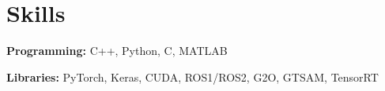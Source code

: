 \documentclass[letterpaper,11pt]{article}
\newcommand{\resumeSubHeadingListStart}{\begin{itemize}[leftmargin=0.15in, label={}]}
\newcommand{\resumeSubHeadingListEnd}{\end{itemize}}
\begin{document}
				
				
				
				



\section{Skills}
	\vspace{2pt}
	\resumeSubHeadingListStart
		\small{\item{
				\textbf{Programming:}{ C++, Python, C, MATLAB} \\ \vspace{3pt}
				
				\textbf{Libraries:}{ PyTorch, Keras, CUDA, ROS1/ROS2, G2O, GTSAM, TensorRT} \\ \vspace{3pt}
				
				
		}}
	\resumeSubHeadingListEnd
\end{document}
